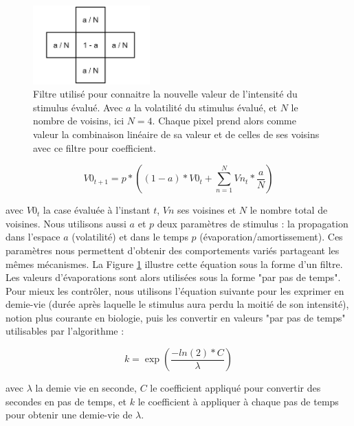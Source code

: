 			\begin{figure}
			\centering
			\includegraphics[width=0.4\textwidth]{./Pictures/Figures/flou.JPG}
			\caption[Filtre utilisé pour connaitre la nouvelle valeur de l'intensité du stimulus évalué.]{Filtre utilisé pour connaitre la nouvelle valeur de l'intensité du stimulus évalué. Avec $a$ la volatilité du stimulus évalué, et $N$ le nombre de voisins, ici $N=4$. Chaque pixel prend alors comme valeur la combinaison linéaire de sa valeur et de celles de ses voisins avec ce filtre pour coefficient.}
			\label{flou}
			\end{figure}
			
			\begin{equation}
			V0_{t+1} = p * ((1-a) * V0_t + \sum_{n=1}^{N} Vn_t * \frac{a}{N})
			\end{equation}
			
			avec $V0_t$ la case évaluée à l'instant $t$, $Vn$ ses voisines et $N$ le nombre total de voisines. Nous utilisons aussi $a$ et $p$ deux paramètres de stimulus : la propagation dans l'espace $a$ (volatilité) et dans le temps $p$ (évaporation/amortissement). Ces paramètres nous permettent d'obtenir des comportements variés partageant les mêmes mécanismes. La Figure \ref{flou} illustre cette équation sous la forme d'un filtre. Les valeurs d'évaporations sont alors utilisées sous la forme "par pas de temps". Pour mieux les contrôler, nous utilisons l'équation suivante pour les exprimer en demie-vie (durée après laquelle le stimulus aura perdu la moitié de son intensité), notion plus courante en biologie, puis les convertir en valeurs "par pas de temps" utilisables par l'algorithme :
			
			\begin{equation}
			k = \exp(\frac{-ln(2) * C}{\lambda})
			\end{equation}
			
			avec $\lambda$ la demie vie en seconde, $C$ le coefficient appliqué pour convertir des secondes en pas de temps, et $k$ le coefficient à appliquer à chaque pas de temps pour obtenir une demie-vie de $\lambda$.
			
